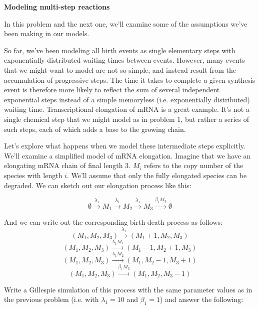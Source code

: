 \documentclass{exam}
\begin{document}
\begin{questions}
\question
\textbf{Modeling multi-step reactions}
 
In this problem and the next one, we’ll examine some of the assumptions we’ve been making in our models.  
 
So far, we’ve been modeling all birth events as single elementary steps with exponentially distributed waiting times between events. However, many events that we might want to model are not so simple, and instead result from the accumulation of progressive steps. The time it takes to complete a given synthesis event is therefore more likely to reflect the sum of several independent exponential steps instead of a simple memoryless (i.e. exponentially distributed) waiting time. Transcriptional elongation of mRNA is a great example. It’s not a single chemical step that we might model as in problem 1, but rather a series of such steps, each of which adds a base to the growing chain.  
 
Let’s explore what happens when we model these intermediate steps explicitly. We’ll examine a simplified model of mRNA elongation. Imagine that we have an elongating mRNA chain of final length 3. $M_i$ refers to the copy number of the species with length $i$.  We’ll assume that only the fully elongated species can be degraded. We can sketch out our elongation process like this:  
 
	$$\emptyset \xrightarrow{\lambda_1} M_1 \xrightarrow{\lambda_1} M_2 \xrightarrow{\lambda_1} M_3 \xrightarrow{\beta_1M_3} \emptyset $$
  
 
And we can write out the corresponding birth-death process as follows:  
$$(M_1, M_2, M_3) \xrightarrow{\lambda_1} (M_1 +1,M_2,M_3)$$
$$(M_1, M_2, M_3) \xrightarrow{\lambda_1M_1} (M_1 - 1,M_2 + 1,M_3)$$
$$(M_1, M_2, M_3) \xrightarrow{\lambda_1M_2} (M_1,M_2 - 1,M_3 + 1)$$
$$(M_1, M_2, M_3) \xrightarrow{\beta_1M_3} (M_1,M_2,M_3 - 1)$$
 
Write a Gillespie simulation of this process with the same parameter values as in the previous problem (i.e. with $\lambda_1= 10$ and $\beta_1 = 1$) and answer the following:  
\end{questions}
\end{document}
